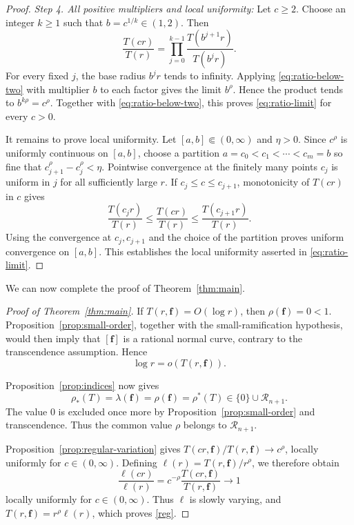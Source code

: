 \documentclass[12pt,letterpaper,reqno]{amsart}
\theoremstyle{definition}
\numberwithin{equation}{section}
\newcommand{\Gn}{\mathcal R_{n+1}}
\newcommand{\fv}{\bm f}
\begin{document}
\begin{proof}
\medskip\noindent
\emph{{Step 4. All positive multipliers and local uniformity:}}
Let \(c\geq2\). Choose an integer \(k\geq1\) such that
\(b=c^{1/k}\in(1,2)\). Then
\[
\frac{T(cr)}{T(r)}
=
\prod_{j=0}^{k-1}
\frac{T(b^{j+1}r)}{T(b^jr)}.
\]
For every fixed \(j\), the base radius \(b^jr\) tends to infinity.
Applying \eqref{eq:ratio-below-two} with multiplier \(b\) to each
factor gives the limit \(b^\rho\). Hence the product tends to
\(b^{k\rho}=c^\rho\). Together with
\eqref{eq:ratio-below-two}, this proves \eqref{eq:ratio-limit} for
every \(c>0\).

It remains to prove local uniformity. Let
\([a,b]\Subset(0,\infty)\) and \(\eta>0\). Since \(c^\rho\) is
uniformly continuous on \([a,b]\), choose a partition
\(a=c_0<c_1<\cdots<c_m=b\) so fine that
\(c_{j+1}^\rho-c_j^\rho<\eta\).
Pointwise convergence at the finitely many points \(c_j\) is uniform
in \(j\) for all sufficiently large \(r\). If
\(c_j\leq c\leq c_{j+1}\), monotonicity of \(T(cr)\) in \(c\) gives
\[
\frac{T(c_jr)}{T(r)}
\leq
\frac{T(cr)}{T(r)}
\leq
\frac{T(c_{j+1}r)}{T(r)}.
\]
Using the convergence at \(c_j,c_{j+1}\) and the choice of the
partition proves uniform convergence on \([a,b]\). This establishes
the local uniformity asserted in \eqref{eq:ratio-limit}.
\end{proof}


We can now complete the proof of Theorem~\ref{thm:main}.

\begin{proof}[Proof of Theorem~\ref{thm:main}]
If \(T(r,\fv)=O(\log r)\), then \(\rho(\fv)=0<1\).
Proposition~\ref{prop:small-order}, together with the small-ramification
hypothesis, would then imply that \([\fv]\) is a rational normal curve,
contrary to the transcendence assumption. Hence 
\[
\log r=o(T(r,\fv)).
\]

Proposition~\ref{prop:indices} now gives
\[
\rho_*(T)
=
\lambda(\fv)
=
\rho(\fv)
=
\rho^*(T)
\in
\{0\}\cup\Gn.
\]
The value \(0\) is excluded once more by
Proposition~\ref{prop:small-order} and transcendence. Thus the common
value \(\rho\) belongs to \(\Gn\).

Proposition~\ref{prop:regular-variation} gives
\(T(cr,\fv)/T(r,\fv)\to c^\rho\), locally uniformly for
\(c\in(0,\infty)\). Defining
\(\ell(r)=T(r,\fv)/r^\rho\), we therefore obtain
\[
\frac{\ell(cr)}{\ell(r)}
=
c^{-\rho}
\frac{T(cr,\fv)}{T(r,\fv)}
\longrightarrow1
\]
locally uniformly for \(c\in(0,\infty)\). Thus \(\ell\) is slowly
varying, and
\(T(r,\fv)=r^\rho\ell(r)\), which proves \eqref{reg}.
\end{proof}
\end{document}
